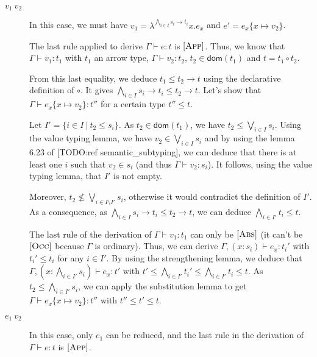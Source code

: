 \documentclass[a4paper]{article}%
\newcommand{\apply}[2]{#1\circ#2}
\newcommand{\dom}[1]{\textsf{dom}(#1)}
\newcommand{\alt}{~|~}
\newcommand{\subst}[2]{\{#1 \mapsto #2\}}
\theoremstyle{definition}
\newcommand {\Rule}[1] {[\textsc{#1}]}
\begin{document}
        \begin{description}
          \item[$v_1\ v_2$] In this case, we must have $v_1=\lambda^{\bigwedge_{i\in I} s_i \rightarrow t_i}x.e_x$ and $e'=e_x\subst x {v_2}$.
    
          The last rule applied to derive $\Gamma \vdash e:t$ is $\Rule{App}$.
          Thus, we know that $\Gamma \vdash v_1 : t_1$ with $t_1$ an arrow type, $\Gamma \vdash v_2 : t_2$, $t_2 \in \dom {t_1}$ and $t=\apply {t_1} {t_2}$.
    
          From this last equality, we deduce $t_1 \leq t_2 \rightarrow t$ using the declarative definition of $\circ$.
          It gives $\bigwedge_{i\in I} s_i \rightarrow t_i \leq t_2 \rightarrow t$.
          Let's show that $\Gamma \vdash e_x\subst x {v_2}:t''$ for a certain type $t''\leq t$.
    
          Let $I'=\{i\in I\alt t_2 \leq s_i\}$. As $t_2 \in \dom {t_1}$, we have $t_2 \leq \bigvee_{i\in I} s_i$.
          Using the value typing lemma, we have $v_2 \in \bigvee_{i\in I} s_i$ and by using the lemma 6.23 of [TODO:ref semantic_subtyping],
          we can deduce that there is at least one $i$ such that $v_2 \in s_i$ (and thus $\Gamma \vdash v_2 : s_i$).
          It follows, using the value typing lemma, that $I'$ is not empty.
    
          Moreover, $t_2 \not\leq \bigvee_{i\in I\setminus I'} s_i$, otherwise it would contradict the definition of $I'$.
          As a consequence, as $\bigwedge_{i\in I} s_i \rightarrow t_i \leq t_2 \rightarrow t$,
          we can deduce $\bigwedge_{i \in I'}t_i \leq t$.
    
          The last rule of the derivation of $\Gamma \vdash v_1 : t_1$ can only be $\Rule{Abs}$ (it can't be $\Rule{Occ}$ because $\Gamma$ is ordinary).
          Thus, we can derive $\Gamma,(x:s_i) \vdash e_x : t_i'$ with $t_i' \leq t_i$ for any $i\in I'$. By using the strengthening lemma, we deduce that
          $\Gamma, (x:\bigwedge_{i\in I'} s_i) \vdash e_x:t'$ with $t'\leq \bigwedge_{i\in I'} t_i' \leq \bigwedge_{i\in I'} t_i \leq t$.
          As $t_2 \leq \bigwedge_{i\in I'} s_i$, we can apply the substitution lemma to get $\Gamma \vdash e_x\subst x {v_2}:t''$ with $t'' \leq t' \leq t$.
    
          \item[$e_1\ v_2$] In this case, only $e_1$ can be reduced, and the last rule in the derivation of $\Gamma \vdash e:t$ is $\Rule{App}$.
    

\end{description}
\end{document}
